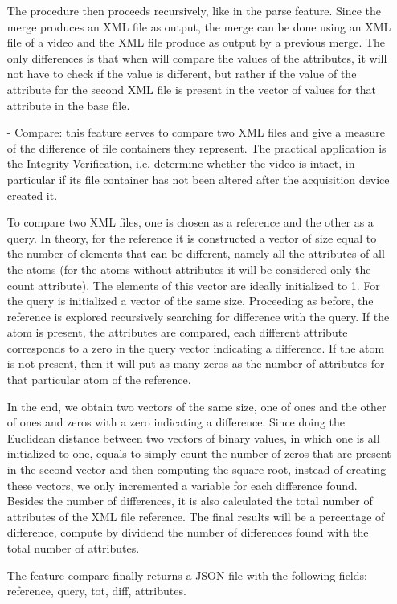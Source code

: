 \begin{itemize}
The procedure then proceeds recursively, like in the parse feature. Since the merge produces an XML file as output, the merge can be done using an XML file of a video and the XML file produce as output by a previous merge. The only differences is that when will compare the values of the attributes, it will not have to check if the value is different, but rather if the value of the attribute for the second XML file is present in the vector of values for that attribute in the base file. 

\item[-] Compare: this feature serves to compare two XML files and give a measure of the difference of file containers they represent. The practical application is the Integrity Verification, i.e. determine whether the video is intact, in particular if its file container has not been altered after the acquisition device created it.

To compare two XML files, one is chosen as a reference and the other as a query. In theory, for the reference it is constructed a vector of size equal to the number of elements that can be different, namely all the attributes of all the atoms (for the atoms without attributes it will be considered only the count attribute). The elements of this vector are ideally initialized to 1. For the query is initialized a vector of the same size. Proceeding as before, the reference is explored recursively searching for difference with the query. If the atom is present, the attributes are compared, each different attribute corresponds to a zero in the query vector indicating a difference. If the atom is not present, then it will put as many zeros as the number of attributes for that particular atom of the reference.

In the end, we obtain two vectors of the same size, one of ones and the other of ones and zeros with a zero indicating a difference.
Since doing the Euclidean distance between two vectors of binary values, in which one is all initialized to one, equals to simply count the number of zeros that are present in the second vector and then computing the square root, instead of creating these vectors, we only incremented a variable for each difference found.
Besides the number of differences, it is also calculated the total number of attributes of the XML file reference. The final results will be a percentage of difference, compute by dividend the number of differences found with the total number of attributes.

The feature compare finally returns a JSON file with the following fields: reference, query, tot, diff, attributes.
\end{itemize}
 
